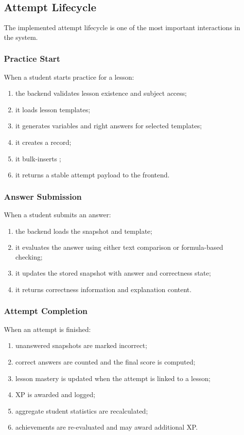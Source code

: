 \subsection{Attempt Lifecycle}

The implemented attempt lifecycle is one of the most important interactions in the system.

\subsubsection*{Practice Start}

When a student starts practice for a lesson:
\begin{enumerate}
  \item the backend validates lesson existence and subject access;
  \item it loads lesson templates;
  \item it generates variables and right answers for selected templates;
  \item it creates a  record;
  \item it bulk-inserts ;
  \item it returns a stable attempt payload to the frontend.
\end{enumerate}

\subsubsection*{Answer Submission}

When a student submits an answer:
\begin{enumerate}
  \item the backend loads the snapshot and template;
  \item it evaluates the answer using either text comparison or formula-based checking;
  \item it updates the stored snapshot with answer and correctness state;
  \item it returns correctness information and explanation content.
\end{enumerate}

\subsubsection*{Attempt Completion}

When an attempt is finished:
\begin{enumerate}
  \item unanswered snapshots are marked incorrect;
  \item correct answers are counted and the final score is computed;
  \item lesson mastery is updated when the attempt is linked to a lesson;
  \item XP is awarded and logged;
  \item aggregate student statistics are recalculated;
  \item achievements are re-evaluated and may award additional XP.
\end{enumerate}

